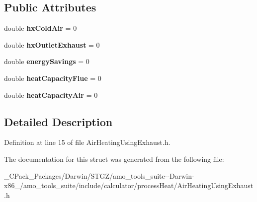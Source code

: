 \subsection*{Public Attributes}
\begin{DoxyCompactItemize}
\item 
\mbox{\label{struct_air_heating_using_exhaust_1_1_output_a8fcda9f3017296006d050361b8cb3535}} 
double {\bfseries hx\+Cold\+Air} = 0
\item 
\mbox{\label{struct_air_heating_using_exhaust_1_1_output_a5ed66cf9105af79b3dc8cfaa2292ba5a}} 
double {\bfseries hx\+Outlet\+Exhaust} = 0
\item 
\mbox{\label{struct_air_heating_using_exhaust_1_1_output_a1e4b961de2742d22f0498362821c40be}} 
double {\bfseries energy\+Savings} = 0
\item 
\mbox{\label{struct_air_heating_using_exhaust_1_1_output_a539a46a4366b3a067ab163b57d8e6059}} 
double {\bfseries heat\+Capacity\+Flue} = 0
\item 
\mbox{\label{struct_air_heating_using_exhaust_1_1_output_a94467c04c4e49b921a161437fae33502}} 
double {\bfseries heat\+Capacity\+Air} = 0
\end{DoxyCompactItemize}


\subsection{Detailed Description}


Definition at line 15 of file Air\+Heating\+Using\+Exhaust.\+h.



The documentation for this struct was generated from the following file\+:\begin{DoxyCompactItemize}
\item 
\+\_\+\+C\+Pack\+\_\+\+Packages/\+Darwin/\+S\+T\+G\+Z/amo\+\_\+tools\+\_\+suite-\/-\/\+Darwin-\/x86\+\_/amo\+\_\+tools\+\_\+suite/include/calculator/process\+Heat/Air\+Heating\+Using\+Exhaust.\+h\end{DoxyCompactItemize}
